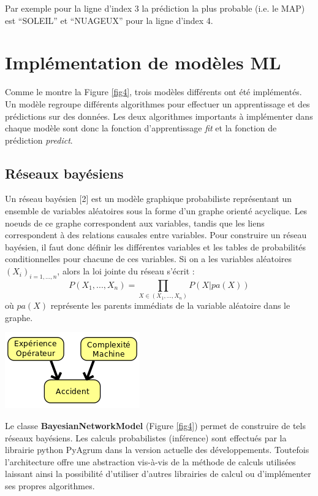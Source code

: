 Par exemple pour la ligne d'index 3 la prédiction la plus probable (i.e. le MAP) est “SOLEIL” et “NUAGEUX” pour la ligne d'index 4.

\section{Implémentation de modèles ML}

Comme le montre la Figure \ref{fig4}, trois modèles différents ont été implémentés. Un modèle regroupe différents algorithmes pour effectuer un apprentissage et des prédictions sur des données. Les deux algorithmes importants à implémenter dans chaque modèle sont donc la fonction d’apprentissage \textit{fit}  et la fonction de prédiction \textit{predict}.

\subsection{Réseaux bayésiens}

Un réseau bayésien [2] est un modèle graphique probabiliste représentant un ensemble de variables aléatoires sous la forme d'un graphe orienté acyclique. Les noeuds de ce graphe correspondent aux variables, tandis que les liens correspondent à des relations causales entre variables. Pour construire un réseau bayésien, il faut donc définir les différentes variables et les tables de probabilités conditionnelles pour chacune de ces variables. Si on a les variables aléatoires $(X_{i})_{i=1,...,n}$, alors la loi jointe du réseau s’écrit :
$$P(X_{1}, ...,X_{n})= \prod_{X \in (X_{1}, ...,X_{n})} P(X|pa(X))$$
où $pa(X)$ représente les parents immédiats de la variable aléatoire  dans le graphe.

\begin{center}
\includegraphics[scale=0.6]{figures/exemple_RB.png}
\label{fig6}
\end{center}

Le classe \textbf{BayesianNetworkModel} (Figure \ref{fig4}) permet de construire de tels réseaux bayésiens. Les calculs probabilistes (inférence) sont effectués par  la librairie python PyAgrum dans la version actuelle des développements. Toutefois l’architecture offre une abstraction vis-à-vis de la méthode de calculs utilisées laissant ainsi la possibilité d’utiliser d’autres librairies de calcul ou d’implémenter ses propres algorithmes.


